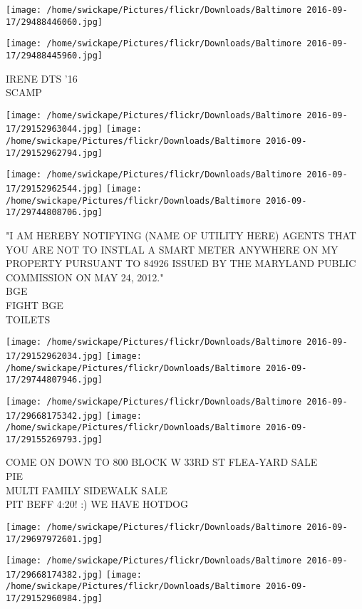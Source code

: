 \documentclass[10pt,letterpaper]{article}
\begin{document}
\texttt{[image: /home/swickape/Pictures/flickr/Downloads/Baltimore 2016-09-17/29488446060.jpg]}

\vspace{0.25in}
\texttt{[image: /home/swickape/Pictures/flickr/Downloads/Baltimore 2016-09-17/29488445960.jpg]}

IRENE DTS '16\\
SCAMP
\pagebreak

\texttt{[image: /home/swickape/Pictures/flickr/Downloads/Baltimore 2016-09-17/29152963044.jpg]}
\texttt{[image: /home/swickape/Pictures/flickr/Downloads/Baltimore 2016-09-17/29152962794.jpg]}

\texttt{[image: /home/swickape/Pictures/flickr/Downloads/Baltimore 2016-09-17/29152962544.jpg]}
\texttt{[image: /home/swickape/Pictures/flickr/Downloads/Baltimore 2016-09-17/29744808706.jpg]}

"I AM HEREBY NOTIFYING (NAME OF UTILITY HERE) AGENTS THAT YOU ARE NOT TO INSTLAL A SMART METER ANYWHERE ON MY PROPERTY PURSUANT TO 84926 ISSUED BY THE MARYLAND PUBLIC COMMISSION ON MAY 24, 2012."\\
BGE\\
FIGHT BGE\\
TOILETS
\pagebreak

\texttt{[image: /home/swickape/Pictures/flickr/Downloads/Baltimore 2016-09-17/29152962034.jpg]}
\texttt{[image: /home/swickape/Pictures/flickr/Downloads/Baltimore 2016-09-17/29744807946.jpg]}

\texttt{[image: /home/swickape/Pictures/flickr/Downloads/Baltimore 2016-09-17/29668175342.jpg]}
\texttt{[image: /home/swickape/Pictures/flickr/Downloads/Baltimore 2016-09-17/29155269793.jpg]}

COME ON DOWN TO 800 BLOCK W 33RD ST FLEA{-}YARD SALE\\
PIE\\
MULTI FAMILY SIDEWALK SALE\\
PIT BEFF 4:20! :) WE HAVE HOTDOG
\pagebreak

\texttt{[image: /home/swickape/Pictures/flickr/Downloads/Baltimore 2016-09-17/29697972601.jpg]}

\vspace{0.25in}
\texttt{[image: /home/swickape/Pictures/flickr/Downloads/Baltimore 2016-09-17/29668174382.jpg]}
\texttt{[image: /home/swickape/Pictures/flickr/Downloads/Baltimore 2016-09-17/29152960984.jpg]}
\end{document}
